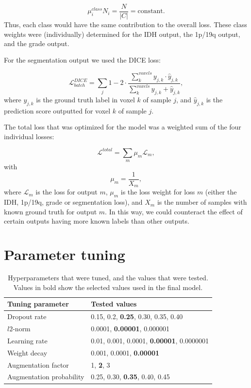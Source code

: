 \begin{subappendices}
\begin{equation}
    \mu_i^{class} N_{i} = \frac{N}{\left|C\right|} = \text{constant}.
\end{equation}
Thus, each class would have the same contribution to the overall loss.
These class weights were (individually) determined for the IDH output, the 1p/19q output, and the grade output.

For the segmentation output we used the DICE loss:

\begin{equation}
    \mathcal{L}^{DICE}_{batch} = \sum_j 1 - 2 \cdot \frac{\sum_k^{voxels} y_{j, k} \cdot \hat{y}_{j, k}}{\sum_k^{voxels} y_{j, k} + \hat{y}_{j, k}},
\end{equation}
where $y_{j, k}$ is the ground truth label in voxel $k$ of sample $j$, and $\hat{y}_{j,k}$ is the prediction score outputted for voxel $k$ of sample $j$.

The total loss that was optimized for the model was a weighted sum of the four individual losses:

\begin{equation}
    \mathcal{L}^{total} = \sum_m \mu_m \mathcal{L}_m,
\end{equation}
with
\begin{equation}
    \mu_m = \frac{1}{X_m},
\end{equation}
where $\mathcal{L}_m$ is the loss for output $m$, $\mu_m$ is the loss weight for loss $m$ (either the IDH, 1p/19q, grade or segmentation loss), and $X_m$ is the number of samples with known ground truth for output $m$.
In this way, we could counteract the effect of certain outputs having more known labels than other outputs.



\newpage

\section{Parameter tuning}\label{app:hyperparameter_tuning}


\begin{table}[htbp]
\centering
\caption{Hyperparameters that were tuned, and the values that were tested. Values in bold show the selected values used in the final model.}
\begin{tabular}{ll}
\toprule
Tuning parameter & Tested values\\
\midrule
Dropout rate & 0.15, 0.2, \textbf{0.25}, 0.30, 0.35, 0.40\\
$l2$-norm & 0.0001, \textbf{0.00001}, 0.000001\\
Learning rate & 0.01, 0.001, 0.0001, \textbf{0.00001}, 0.0000001\\
Weight decay & 0.001, 0.0001, \textbf{0.00001}\\
Augmentation factor & 1, \textbf{2}, 3\\
Augmentation probability & 0.25, 0.30, \textbf{0.35}, 0.40, 0.45\\
\bottomrule
\end{tabular}
\end{table}


\end{subappendices}
